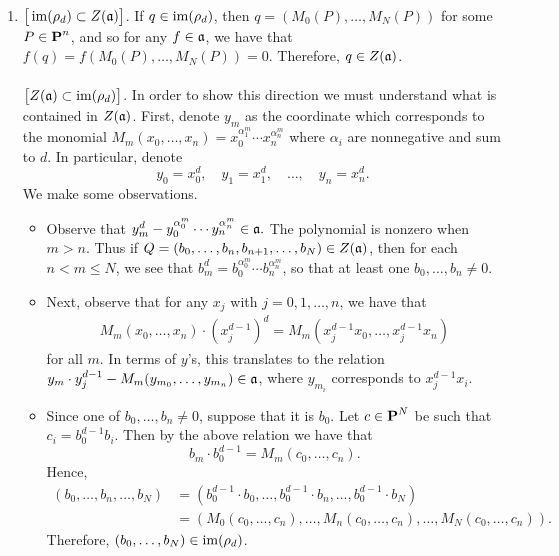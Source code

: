 \documentclass[10pt]{amsart}
\begin{document}
\begin{solution}
\begin{luke}
\begin{enumerate}
            \item ${\big[}\operatorname{im}(\rho_d) \subset Z(\mathfrak{a}){\big]}$. 
            If $q \in \operatorname{im}(\rho_d)$, then $q = (M_0(P), \dots, M_N(P))$ for some $P \in \operatorname{\mathbf{P}}^n$, 
            and so for any $f \in \mathfrak{a}$, we have that $f(q) = f(M_0(P), \dots, M_N(P)) = 0.$
            Therefore, $q \in Z(\mathfrak{a})$.
            \\
            \\
            \noindent ${\big[}Z(\mathfrak{a}) \subset \operatorname{im}(\rho_d){\big]}$. 
            In order to show this direction we must understand what is contained in $Z(\mathfrak{a})$. 
            First, denote $y_m$ as the coordinate which corresponds to the monomial 
            $M_m(x_0, \dots, x_n) = x_0^{\alpha_1^m} \cdots x_n^{\alpha_n^{m}}$ where $\alpha_i$ are nonnegative and 
            sum to $d$. In particular, denote
            \[
                y_0 = x_0^d, \quad y_1 = x_1^d, \quad \dots, \quad y_n = x_n^{d}.
            \]
            We make some observations. 
            \begin{itemize}
                \item Observe that $y_m^d - y_0^{\alpha_0^m} \cdots y_n^{\alpha_n^{m}} \in \mathfrak{a}.$
                The polynomial is nonzero when $m > n$. 
                Thus if $ Q = (b_0, \dots, b_n, b_{n+1}, \dots, b_{N}) \in Z(\mathfrak{a})$, then for each $n < m \le N$, we see that 
                $b_m^d = b_0^{\alpha_0^m} \cdots b_n^{\alpha_n^{m}}$, so that at least one $b_0, \dots, b_n \ne 0$.

                \item Next, observe that for any $x_j$ with 
                $j = 0, 1, \dots, n$, we have that
                \begin{align*}
                    M_m(x_0, \dots, x_n)\cdot (x_j^{d-1})^{d}
                    =
                    M_m(x_j^{d-1}x_0, \dots, x_j^{d-1}x_n)
                \end{align*}
                for all $m$.
                In terms of $y$'s, this translates to the relation 
                $y_m \cdot y_j^{d-1}- M_m(y_{m_0}, \dots, y_{m_n}) \in \mathfrak{a}$, 
                where $y_{m_i}$ corresponds to $x_j^{d-1}x_i$.

                \item Since one of $b_0, \dots, b_n \ne 0$, suppose that it is $b_0$. 
                Let $c \in \operatorname{\mathbf{P}}^N$ be such that $c_i = b_0^{d-1}b_i$. 
                Then by the above relation we have that 
                \[
                    b_m\cdot b_0^{d-1} = M_m(c_0, \dots, c_n).
                \]
                Hence, 
                \begin{align*}
                    (b_0, \dots, b_n, \dots, b_N) 
                    &=
                    (b_0^{d-1}\cdot b_0, \dots, b_0^{d-1} \cdot b_n, \dots, b_0^{d-1} \cdot b_N)\\
                    &=
                    (M_0(c_0, \dots, c_n), \dots, M_n(c_0, \dots, c_n), \dots, M_N(c_0, \dots, c_n)).
                \end{align*}
                Therefore, $(b_0, \dots, b_N) \in \operatorname{im}(\rho_d)$. 
    

\end{itemize}
\end{enumerate}
\end{luke}
\end{solution}
\end{document}
